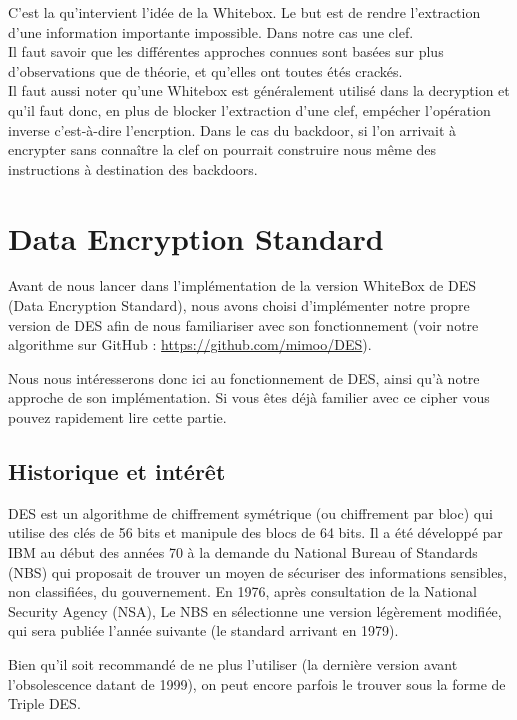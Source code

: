 \documentclass[a4paper,12pt]{article}
\begin{document}
C'est la qu'intervient l'idée de la Whitebox. Le but est de rendre l'extraction d'une information importante impossible. Dans notre cas une clef.\\
Il faut savoir que les différentes approches connues sont basées sur plus d'observations que de théorie, et qu'elles ont toutes étés crackés.\\
Il faut aussi noter qu'une Whitebox est généralement utilisé dans la decryption et qu'il faut donc, en plus de blocker l'extraction d'une clef, empécher l'opération inverse c'est-à-dire l'encrption. Dans le cas du backdoor, si l'on arrivait à encrypter sans connaître la clef on pourrait construire nous même des instructions à destination des backdoors.\\

\newpage
	
\section{Data Encryption Standard}

Avant de nous lancer dans l'implémentation de la version WhiteBox de DES (Data Encryption Standard), nous avons choisi d'implémenter notre propre version de DES afin de nous familiariser avec son fonctionnement (voir notre algorithme sur GitHub : \url{https://github.com/mimoo/DES}).
	
Nous nous intéresserons donc ici au fonctionnement de DES, ainsi qu'à notre approche de son implémentation. Si vous êtes déjà familier avec ce cipher vous pouvez rapidement lire cette partie.

\subsection{Historique et intérêt}

DES est un algorithme de chiffrement symétrique (ou chiffrement par bloc) qui utilise des clés de 56 bits et manipule des blocs de 64 bits. Il a été développé par IBM au début des années 70 à la demande du National Bureau of Standards (NBS) qui proposait de trouver un moyen de sécuriser des informations sensibles, non classifiées, du gouvernement. En 1976, après consultation de la National Security Agency (NSA), Le NBS en sélectionne une version légèrement modifiée, qui sera publiée l'année suivante (le standard arrivant en 1979).

Bien qu'il soit recommandé de ne plus l'utiliser (la dernière version avant l'obsolescence datant de 1999), on peut encore parfois le trouver sous la forme de Triple DES.
	
\end{document}

